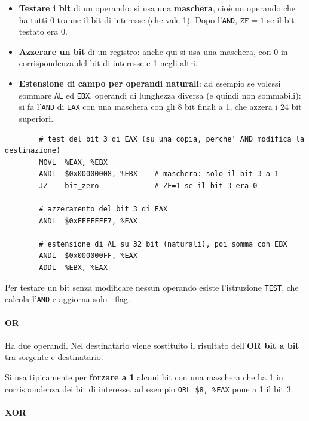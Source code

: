 \documentclass[11pt,a4paper]{article}
\begin{document}
\begin{itemize}[leftmargin=*]
  \item \textbf{Testare i bit} di un operando: si usa una \textbf{maschera}, cioè un operando che ha tutti 0 tranne il bit di interesse (che vale 1). Dopo l'\texttt{AND}, $\texttt{ZF}=1$ se il bit testato era 0.
  \item \textbf{Azzerare un bit} di un registro: anche qui si usa una maschera, con 0 in corrispondenza del bit di interesse e 1 negli altri.
  \item \textbf{Estensione di campo per operandi naturali}: ad esempio se volessi sommare \texttt{AL} ed \texttt{EBX}, operandi di lunghezza diversa (e quindi non sommabili): si fa l'\texttt{AND} di \texttt{EAX} con una maschera con gli 8 bit finali a 1, che azzera i 24 bit superiori.
\end{itemize}

\begin{integrazione}
\begin{lstlisting}
        # test del bit 3 di EAX (su una copia, perche' AND modifica la destinazione)
        MOVL  %EAX, %EBX
        ANDL  $0x00000008, %EBX    # maschera: solo il bit 3 a 1
        JZ    bit_zero             # ZF=1 se il bit 3 era 0

        # azzeramento del bit 3 di EAX
        ANDL  $0xFFFFFFF7, %EAX

        # estensione di AL su 32 bit (naturali), poi somma con EBX
        ANDL  $0x000000FF, %EAX
        ADDL  %EBX, %EAX
\end{lstlisting}
Per testare un bit senza modificare nessun operando esiste l'istruzione \texttt{TEST}, che calcola l'\texttt{AND} e aggiorna solo i flag.
\end{integrazione}

\paragraph*{OR}

Ha due operandi. Nel destinatario viene sostituito il risultato dell'\textbf{OR bit a bit} tra sorgente e destinatario.

\begin{integrazione}
Si usa tipicamente per \textbf{forzare a 1} alcuni bit con una maschera che ha 1 in corrispondenza dei bit di interesse, ad esempio \texttt{ORL \$8, \%EAX} pone a 1 il bit 3.
\end{integrazione}

\paragraph*{XOR}
\end{document}
